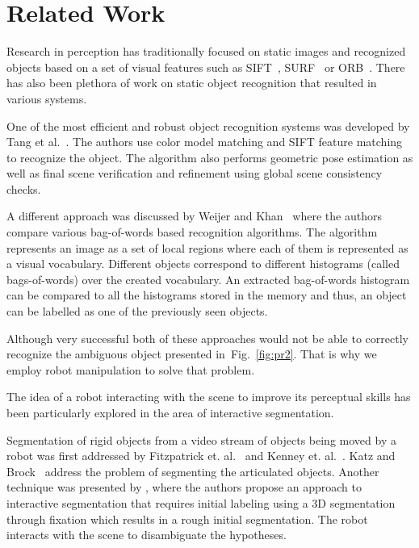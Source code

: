 \documentclass[conference]{IEEEtran}
\newcommand{\figref}[1]{Fig.~\ref{#1}}
\begin{document}
\section{Related Work}



	Research in perception has traditionally focused on  static images and recognized objects based on a set of visual features such as SIFT~\cite{lowe2004distinctive}, SURF~\cite{bay2006surf} or ORB~\cite{rublee2011orb}.
    There has also been plethora of work on static object recognition that resulted in various systems.
	
	One of the most efficient and robust object recognition systems was developed by Tang et al.~\cite{tang2012textured}. The authors use color model matching and SIFT feature matching to recognize the object. The algorithm also performs geometric pose estimation as well as final scene verification and refinement using global scene consistency checks. 

    A different approach was discussed by Weijer and Khan~\cite{van2013fusing} where the authors compare various bag-of-words based recognition algorithms. The algorithm represents an image as a set of local regions where each of them is represented as a visual vocabulary. Different objects correspond to different histograms (called bags-of-words) over the created vocabulary. An extracted bag-of-words histogram can be compared to all the histograms stored in the memory and thus, an object can be labelled as one of the previously seen objects.

    Although very successful both of these approaches would not be able to correctly recognize the ambiguous object presented in~\figref{fig:pr2}. That is why we employ robot manipulation to solve that problem.

    The idea of a robot interacting with the scene to improve its perceptual skills has been particularly explored in the area of interactive segmentation.

    Segmentation of rigid objects from a video stream of objects being moved by a robot was first addressed by Fitzpatrick et. al.~\cite{fitzpatrick_active_vision} and Kenney et. al.~\cite{KenneyInteractive}. Katz and Brock~\cite{Katz-WS-MM-ICRA2011} address the problem of segmenting the articulated objects. Another technique was presented by \cite{bergstrom11icvs}, where the authors propose an approach to interactive segmentation that requires initial labeling using  a 3D segmentation through fixation which results in a rough initial segmentation. The robot interacts with the scene to disambiguate the hypotheses.
\end{document}
